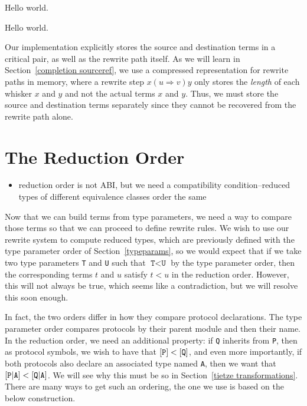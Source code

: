 \documentclass[../generics]{subfiles}
\begin{document}
\begin{algorithm}\label{trie lookup algo}
Hello world.
\end{algorithm}

\begin{algorithm}\label{term reduction trie algo}
Hello world.
\end{algorithm}

Our implementation explicitly stores the source and destination terms in a critical pair, as well as the rewrite path itself. As we will learn in Section~\ref{completion sourceref}, we use a compressed representation for rewrite paths in memory, where a rewrite step $x(u\Rightarrow v)y$ only stores the \emph{length} of each whisker $x$ and $y$ and not the actual terms $x$ and $y$. Thus, we must store the source and destination terms separately since they cannot be recovered from the rewrite path alone.

\section{The Reduction Order}\label{reduction order}

\begin{itemize}
\item reduction order is not ABI, but we need a compatibility condition--reduced types of different equivalence classes order the same
\end{itemize}

%

Now that we can build terms from type parameters, we need a way to compare those terms so that we can proceed to define rewrite rules. We wish to use our rewrite system to compute reduced types, which are previously defined with the type parameter order of Section~\ref{typeparams}, so we would expect that if we take two type parameters \texttt{T} and \texttt{U} such that $\texttt{T}<\texttt{U}$ by the type parameter order, then the corresponding terms $t$ and $u$ satisfy $t<u$ in the reduction order. However, this will not always be true, which seems like a contradiction, but we will resolve this soon enough.

In fact, the two orders differ in how they compare protocol declarations. The type parameter order compares protocols by their parent module and then their name. In the reduction order, we need an additional property: if \texttt{Q} inherits from \texttt{P}, then as protocol symbols, we wish to have that $[\texttt{P}]<[\texttt{Q}]$, and even more importantly, if both protocols also declare an associated type named \texttt{A}, then we want that $[\texttt{P}|\texttt{A}]<[\texttt{Q}|\texttt{A}]$. We will see why this must be so in Section~\ref{tietze transformations}. There are many ways to get such an ordering, the one we use is based on the below construction.
\end{document}
